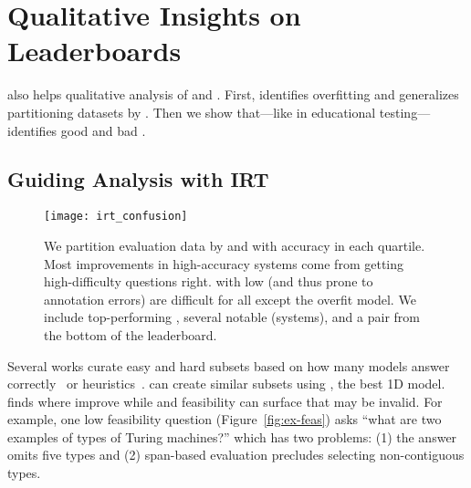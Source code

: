 \section{Qualitative Insights on Leaderboards}
\label{ch:isicle:interp}

\name{} also helps qualitative analysis of \itms{} and \subjs{}.
First, \irt{} identifies overfitting and generalizes partitioning datasets by \diff{}.
Then we show that---like in educational testing---\irt{} identifies good and bad \itms{}.

\subsection{Guiding Analysis with IRT}

\begin{figure*}[t]
    \centering
    \texttt{[image: irt\_confusion]}
    \caption{
        We partition evaluation data by \irt{} \diff{} and
        \discability{} with accuracy in each quartile.
        Most improvements in high-accuracy systems come from getting
        high-difficulty questions right.
        \Itms{} with low \discability{} (and thus prone to annotation errors) are difficult for all \subjs{} except the overfit  model.
        We include top-performing \squad{} \subjs{}, several notable
        \subjs{} (systems), and a pair from the bottom of the leaderboard.
    }
    \label{fig:confusion}
\end{figure*}

Several works curate easy and hard  subsets based on how many
models answer correctly~\citep{Rondeau2018-um} or
heuristics~\citep{sugawara2018easier}.
%
\irt{} can create similar subsets using , the best 1D model.
%
\Diff{} finds where \subjs{} improve while \discability{} and
feasibility can surface \itms{} that may be invalid.
%
For example, one low feasibility question (Figure~\ref{fig:ex-feas}) asks
``what are two examples of types of Turing machines?'' which has two
problems: (1) the answer omits five types and (2) span-based
evaluation precludes selecting non-contiguous types.

